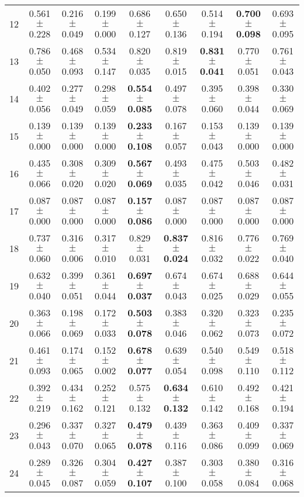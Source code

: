 \begin{table}[!ht]
{\begin{tabular}{r c c c c c c c c}
12 & 0.561 $\pm$ 0.228 & 0.216 $\pm$ 0.049 & 0.199 $\pm$ 0.000 & 0.686 $\pm$ 0.127 & 0.650 $\pm$ 0.136 & 0.514 $\pm$ 0.194 & \textbf{0.700 $\pm$ 0.098} & 0.693 $\pm$ 0.095 \\
13 & 0.786 $\pm$ 0.050 & 0.468 $\pm$ 0.093 & 0.534 $\pm$ 0.147 & 0.820 $\pm$ 0.035 & 0.819 $\pm$ 0.015 & \textbf{0.831 $\pm$ 0.041} & 0.770 $\pm$ 0.051 & 0.761 $\pm$ 0.043 \\
14 & 0.402 $\pm$ 0.056 & 0.277 $\pm$ 0.049 & 0.298 $\pm$ 0.059 & \textbf{0.554 $\pm$ 0.085} & 0.497 $\pm$ 0.078 & 0.395 $\pm$ 0.060 & 0.398 $\pm$ 0.044 & 0.330 $\pm$ 0.069 \\
15 & 0.139 $\pm$ 0.000 & 0.139 $\pm$ 0.000 & 0.139 $\pm$ 0.000 & \textbf{0.233 $\pm$ 0.108} & 0.167 $\pm$ 0.057 & 0.153 $\pm$ 0.043 & 0.139 $\pm$ 0.000 & 0.139 $\pm$ 0.000 \\
16 & 0.435 $\pm$ 0.066 & 0.308 $\pm$ 0.020 & 0.309 $\pm$ 0.020 & \textbf{0.567 $\pm$ 0.069} & 0.493 $\pm$ 0.035 & 0.475 $\pm$ 0.042 & 0.503 $\pm$ 0.046 & 0.482 $\pm$ 0.031 \\
17 & 0.087 $\pm$ 0.000 & 0.087 $\pm$ 0.000 & 0.087 $\pm$ 0.000 & \textbf{0.157 $\pm$ 0.086} & 0.087 $\pm$ 0.000 & 0.087 $\pm$ 0.000 & 0.087 $\pm$ 0.000 & 0.087 $\pm$ 0.000 \\
18 & 0.737 $\pm$ 0.060 & 0.316 $\pm$ 0.006 & 0.317 $\pm$ 0.010 & 0.829 $\pm$ 0.031 & \textbf{0.837 $\pm$ 0.024} & 0.816 $\pm$ 0.032 & 0.776 $\pm$ 0.022 & 0.769 $\pm$ 0.040 \\
19 & 0.632 $\pm$ 0.040 & 0.399 $\pm$ 0.051 & 0.361 $\pm$ 0.044 & \textbf{0.697 $\pm$ 0.037} & 0.674 $\pm$ 0.043 & 0.674 $\pm$ 0.025 & 0.688 $\pm$ 0.029 & 0.644 $\pm$ 0.055 \\
20 & 0.363 $\pm$ 0.066 & 0.198 $\pm$ 0.069 & 0.172 $\pm$ 0.033 & \textbf{0.503 $\pm$ 0.078} & 0.383 $\pm$ 0.046 & 0.320 $\pm$ 0.062 & 0.323 $\pm$ 0.073 & 0.235 $\pm$ 0.072 \\
21 & 0.461 $\pm$ 0.093 & 0.174 $\pm$ 0.065 & 0.152 $\pm$ 0.002 & \textbf{0.678 $\pm$ 0.077} & 0.639 $\pm$ 0.054 & 0.540 $\pm$ 0.098 & 0.549 $\pm$ 0.110 & 0.518 $\pm$ 0.112 \\
22 & 0.392 $\pm$ 0.219 & 0.434 $\pm$ 0.162 & 0.252 $\pm$ 0.121 & 0.575 $\pm$ 0.132 & \textbf{0.634 $\pm$ 0.132} & 0.610 $\pm$ 0.142 & 0.492 $\pm$ 0.168 & 0.421 $\pm$ 0.194 \\
23 & 0.296 $\pm$ 0.043 & 0.337 $\pm$ 0.070 & 0.327 $\pm$ 0.065 & \textbf{0.479 $\pm$ 0.078} & 0.439 $\pm$ 0.116 & 0.363 $\pm$ 0.086 & 0.409 $\pm$ 0.099 & 0.337 $\pm$ 0.069 \\
24 & 0.289 $\pm$ 0.045 & 0.326 $\pm$ 0.087 & 0.304 $\pm$ 0.059 & \textbf{0.427 $\pm$ 0.107} & 0.387 $\pm$ 0.100 & 0.303 $\pm$ 0.058 & 0.380 $\pm$ 0.084 & 0.316 $\pm$ 0.068 \\

\end{tabular}}
\end{table}
